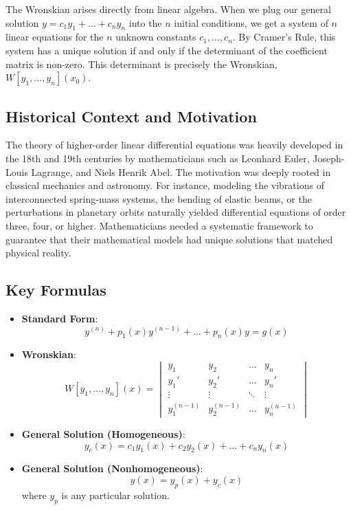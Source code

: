 \documentclass[11pt,letterpaper]{article}
\begin{document}
The Wronskian arises directly from linear algebra. When we plug our general solution $y = c_1 y_1 + \dots + c_n y_n$ into the $n$ initial conditions, we get a system of $n$ linear equations for the $n$ unknown constants $c_1, \dots, c_n$. By Cramer's Rule, this system has a unique solution if and only if the determinant of the coefficient matrix is non-zero. This determinant is precisely the Wronskian, $W[y_1, \dots, y_n](x_0)$.

\subsection{Historical Context and Motivation}
The theory of higher-order linear differential equations was heavily developed in the 18th and 19th centuries by mathematicians such as Leonhard Euler, Joseph-Louis Lagrange, and Niels Henrik Abel. The motivation was deeply rooted in classical mechanics and astronomy. For instance, modeling the vibrations of interconnected spring-mass systems, the bending of elastic beams, or the perturbations in planetary orbits naturally yielded differential equations of order three, four, or higher. Mathematicians needed a systematic framework to guarantee that their mathematical models had unique solutions that matched physical reality.

\subsection{Key Formulas}
\begin{itemize}
    \item \textbf{Standard Form}: \[ y^{(n)} + p_1(x)y^{(n-1)} + \dots + p_n(x)y = g(x) \]
    \item \textbf{Wronskian}: 
    \[ W[y_1, \dots, y_n](x) = \begin{vmatrix} y_1 & y_2 & \dots & y_n \\ y_1' & y_2' & \dots & y_n' \\ \vdots & \vdots & \ddots & \vdots \\ y_1^{(n-1)} & y_2^{(n-1)} & \dots & y_n^{(n-1)} \end{vmatrix} \]
    \item \textbf{General Solution (Homogeneous)}: \[ y_c(x) = c_1 y_1(x) + c_2 y_2(x) + \dots + c_n y_n(x) \]
    \item \textbf{General Solution (Nonhomogeneous)}: \[ y(x) = y_p(x) + y_c(x) \] where $y_p$ is any particular solution.
\end{itemize}
\end{document}
